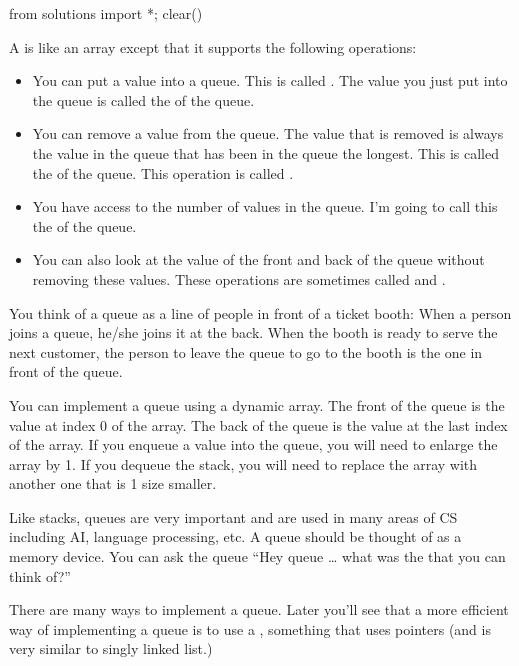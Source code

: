 \begin{python0}
from solutions import *; clear()
\end{python0}

A  is like an array except that it supports the following operations:

\begin{itemize}
\item
  You can put a value into a queue. This is called . The
  value you just put into the queue is called the  of the
  queue.
\item
  You can remove a value from the queue. The value that is removed is
  always the value in the queue that has been in the queue the longest.
  This is called the  of the queue. This operation is
  called .
\item
  You have access to the number of values in the queue. I'm going to
  call this the  of the queue.
\item
  You can also look at the value of the front and back of the queue
  without removing these values. These operations are sometimes called
   and .
\end{itemize}

You think of a queue as a line of people in front of a ticket booth: When a person joins a queue, he/she joins it at the back. When the booth is ready to serve the next customer, the person to leave the queue to go to the booth is the one in front of the queue.

You can implement a queue using a dynamic array. The front of the queue is the value at index 0 of the array. The back of the queue is the value at the last index of the array. If you enqueue a value into the queue, you will need to enlarge the array by 1. If you dequeue the stack, you will need to replace the array with another one that is 1 size smaller.

Like stacks, queues are very important and are used in many areas of CS including AI, language processing, etc. A queue should be thought of as a memory device. You can ask the queue ``Hey queue \ldots{} what was the  that you can think of?''


There are many ways to implement a queue. Later you'll see that a more efficient way of implementing a queue is to use a , something that uses pointers (and is very similar to singly linked list.)

